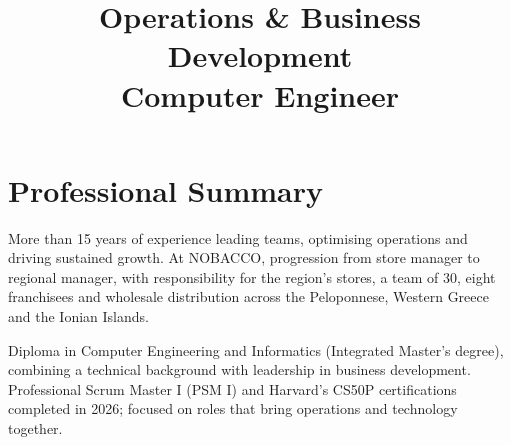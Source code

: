 \documentclass[10pt,a4paper,sans]{moderncv}
\title{Operations \& Business Development\texorpdfstring{\\}{ · }Computer Engineer}  %
\let\cvsectionplain\section
\renewcommand*{\section}[1]{\par\ifdim\dimexpr\pagegoal-\pagetotal\relax<5\baselineskip\newpage\fi\cvsectionplain{#1}}
\begin{document}
\makecvtitle

\section{Professional Summary}
More than 15 years of experience leading teams, optimising operations and driving sustained growth. At NOBACCO, progression from store manager to regional manager, with responsibility for the region’s stores, a team of 30, eight franchisees and wholesale distribution across the Peloponnese, Western Greece and the Ionian Islands.

\smallskip
Diploma in Computer Engineering and Informatics (Integrated Master’s degree), combining a technical background with leadership in business development. Professional Scrum Master I (PSM I) and Harvard’s CS50P certifications completed in 2026; focused on roles that bring operations and technology together.
\end{document}
